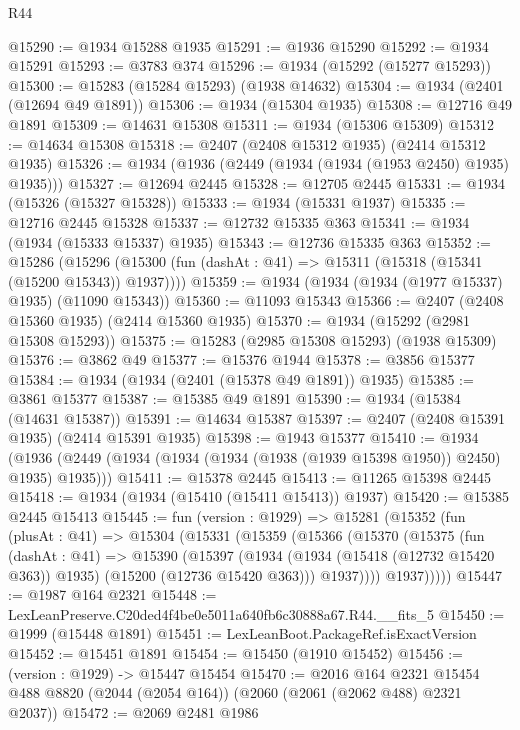 \begin{lexlean}{R44}
\begin{coremodule}
@15290 := @1934 @15288 @1935
@15291 := @1936 @15290
@15292 := @1934 @15291
@15293 := @3783 @374
@15296 := @1934 (@15292 (@15277 @15293))
@15300 := @15283 (@15284 @15293) (@1938 @14632)
@15304 := @1934 (@2401 (@12694 @49 @1891))
@15306 := @1934 (@15304 @1935)
@15308 := @12716 @49 @1891
@15309 := @14631 @15308
@15311 := @1934 (@15306 @15309)
@15312 := @14634 @15308
@15318 := @2407 (@2408 @15312 @1935) (@2414 @15312 @1935)
@15326 := @1934 (@1936 (@2449 (@1934 (@1934 (@1953 @2450) @1935) @1935)))
@15327 := @12694 @2445
@15328 := @12705 @2445
@15331 := @1934 (@15326 (@15327 @15328))
@15333 := @1934 (@15331 @1937)
@15335 := @12716 @2445 @15328
@15337 := @12732 @15335 @363
@15341 := @1934 (@1934 (@15333 @15337) @1935)
@15343 := @12736 @15335 @363
@15352 := @15286
    (@15296 (@15300 (fun (dashAt : @41) => @15311 (@15318 (@15341 (@15200 @15343)) @1937))))
@15359 := @1934 (@1934 (@1934 (@1977 @15337) @1935) (@11090 @15343))
@15360 := @11093 @15343
@15366 := @2407 (@2408 @15360 @1935) (@2414 @15360 @1935)
@15370 := @1934 (@15292 (@2981 @15308 @15293))
@15375 := @15283 (@2985 @15308 @15293) (@1938 @15309)
@15376 := @3862 @49
@15377 := @15376 @1944
@15378 := @3856 @15377
@15384 := @1934 (@1934 (@2401 (@15378 @49 @1891)) @1935)
@15385 := @3861 @15377
@15387 := @15385 @49 @1891
@15390 := @1934 (@15384 (@14631 @15387))
@15391 := @14634 @15387
@15397 := @2407 (@2408 @15391 @1935) (@2414 @15391 @1935)
@15398 := @1943 @15377
@15410 := @1934
    (@1936 (@2449 (@1934 (@1934 (@1934 (@1938 (@1939 @15398 @1950)) @2450) @1935) @1935)))
@15411 := @15378 @2445
@15413 := @11265 @15398 @2445
@15418 := @1934 (@1934 (@15410 (@15411 @15413)) @1937)
@15420 := @15385 @2445 @15413
@15445 := fun (version : @1929) =>
  @15281
    (@15352
      (fun (plusAt : @41) =>
      @15304
        (@15331
          (@15359
            (@15366
              (@15370
                (@15375
                  (fun (dashAt : @41) =>
                  @15390
                    (@15397
                      (@1934
                        (@1934 (@15418 (@12732 @15420 @363)) @1935)
                        (@15200 (@12736 @15420 @363)))
                      @1937))))
              @1937)))))
@15447 := @1987 @164 @2321
@15448 := LexLeanPreserve.C20ded4f4be0e5011a640fb6c30888a67.R44.__fits_5
@15450 := @1999 (@15448 @1891)
@15451 := LexLeanBoot.PackageRef.isExactVersion
@15452 := @15451 @1891
@15454 := @15450 (@1910 @15452)
@15456 := (version : @1929) -> @15447 @15454
@15470 := @2016
    @164
    @2321
    @15454
    @488
    @8820
    (@2044 (@2054 @164))
    (@2060 (@2061 (@2062 @488) @2321 @2037))
@15472 := @2069 @2481 @1986

\end{coremodule}
\end{lexlean}
